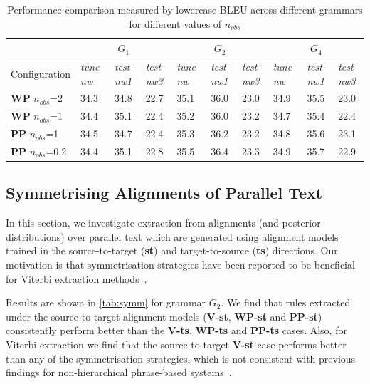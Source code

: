 \begin{table}
  \begin{small}
  \centering
  \begin{tabular}{*{10}{|l}|}
    \hline
    &  &  &  \\
    \hline
    Configuration & {\em tune-nw} & {\em test-nw1} & {\em test-nw3} & {\em tune-nw} & {\em test-nw1} & {\em test-nw3} & {\em tune-nw} & {\em test-nw1} & {\em test-nw3} \\
    \hline
        {\bf WP} $n_{obs}$=2 & 34.3 & 34.8  & 22.7 & 35.1 & 36.0 & 23.0 & 34.9 & 35.5 & 23.0 \\
        \hline
            {\bf WP} $n_{obs}$=1 & 34.4 & 35.1 & 22.4 & 35.2 & 36.0 & 23.2 & 34.7 & 35.4 & 22.4 \\
            \hline
                {\bf PP} $n_{obs}$=1 & 34.5 &  34.7 & 22.4 & 35.3 & 36.2 & 23.2 & 34.8 & 35.6 & 23.1 \\
                \hline
                    {\bf PP} $n_{obs}$=0.2 & 34.4 & 35.1 & 22.8 & 35.5 & 36.4 & 23.3 & 34.9 & 35.7 & 22.9 \\
                    \hline
  \end{tabular}
  \end{small}
  \caption{Performance comparison measured by lowercase BLEU  across different grammars for different values of $n_{obs}$}
  \label{tab:nocc}
\end{table}

\subsection{Symmetrising Alignments of Parallel Text}
\label{sec:extractionFromPosteriorsSymmetrising}

In this section, we investigate extraction from alignments (and posterior
distributions) over parallel text which are generated using alignment models
trained in the source-to-target ({\bf st}) and target-to-source ({\bf ts})
directions. Our motivation is that symmetrisation strategies have been reported
to be beneficial for Viterbi extraction
methods~\citep{koehn-och-marcu:2003:NAACL}. 

Results are shown in \autoref{tab:symm} for grammar $G_2$. We find that rules
extracted under the source-to-target alignment models ({\bf V-st}, {\bf WP-st}
and {\bf PP-st}) consistently perform better than the {\bf V-ts}, {\bf WP-ts}
and {\bf PP-ts} cases. Also, for Viterbi extraction we find that the
source-to-target {\bf V-st} case performs better than any of the symmetrisation
strategies, which is not consistent with previous findings for non-hierarchical
phrase-based systems~\citep{koehn-och-marcu:2003:NAACL}.


